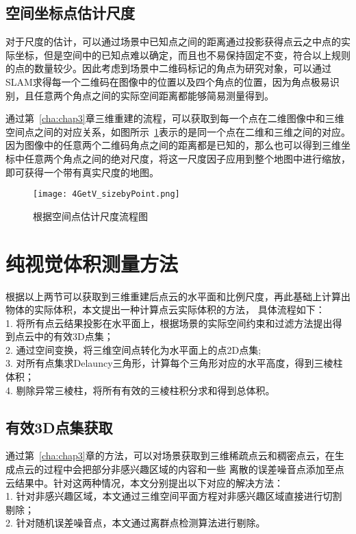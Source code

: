 \subsection{空间坐标点估计尺度}
对于尺度的估计，可以通过场景中已知点之间的距离通过投影获得点云之中点的实际坐标，但是空间中的已知点难以确定，而且也不易保持固定不变，符合以上规则的点的数量较少。因此考虑到场景中二维码标记的角点为研究对象，可以通过SLAM求得每一个二维码在图像中的位置以及四个角点的位置，因为角点极易识别，且任意两个角点之间的实际空间距离都能够简易测量得到。

通过第~\ref{cha:chap3}章三维重建的流程，可以获取到每一个点在二维图像中和三维空间点之间的对应关系，如图所示~\ref{fig:4GetV_sizebyPoint}表示的是同一个点在二维和三维之间的对应。因为图像中的任意两个二维码角点之间的距离都是已知的，那么也可以得到三维坐标中任意两个角点之间的绝对尺度，将这一尺度因子应用到整个地图中进行缩放，即可获得一个带有真实尺度的地图。
\begin{figure}[t] %
  \centering
  \texttt{[image: 4GetV\_sizebyPoint.png]}
  \caption{根据空间点估计尺度流程图}
  \label{fig:4GetV_sizebyPoint}
\end{figure}
\section{纯视觉体积测量方法}
\label{sec:4.4}
根据以上两节可以获取到三维重建后点云的水平面和比例尺度，再此基础上计算出物体的实际体积，本文提出一种计算点云实际体积的方法，
具体流程如下：\\
1.	将所有点云结果投影在水平面上，根据场景的实际空间约束和过滤方法提出得到点云中的有效3D点集；\\
2.	通过空间变换，将三维空间点转化为水平面上的点2D点集;\\
3.	对所有点集求Delauncy三角形，计算每个三角形对应的水平高度，得到三棱柱体积；\\
4.	剔除异常三棱柱，将所有有效的三棱柱积分求和得到总体积。
\subsection{有效3D点集获取}
\label{sec:4.4.1}
通过第~\ref{cha:chap3}章的方法，可以对场景获取到三维稀疏点云和稠密点云，在生成点云的过程中会把部分非感兴趣区域的内容和一些
离散的误差噪音点添加至点云结果中。针对这两种情况，本文分别提出以下对应的解决方法：\\
1.	针对非感兴趣区域，本文通过三维空间平面方程对非感兴趣区域直接进行切割剔除；\\
2.	针对随机误差噪音点，本文通过离群点检测算法进行剔除。

